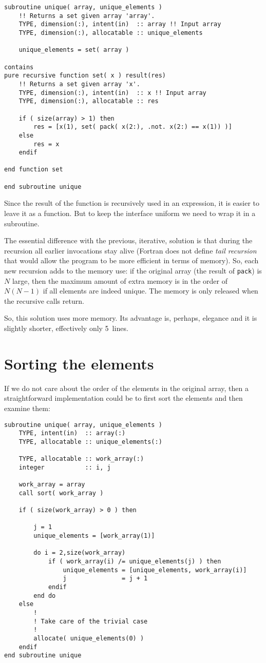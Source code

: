 \documentclass[onecolumn]{article}
\begin{document}
\begin{verbatim}
subroutine unique( array, unique_elements )
    !! Returns a set given array 'array'.
    TYPE, dimension(:), intent(in)  :: array !! Input array
    TYPE, dimension(:), allocatable :: unique_elements

    unique_elements = set( array )

contains
pure recursive function set( x ) result(res)
    !! Returns a set given array 'x'.
    TYPE, dimension(:), intent(in)  :: x !! Input array
    TYPE, dimension(:), allocatable :: res

    if ( size(array) > 1) then
        res = [x(1), set( pack( x(2:), .not. x(2:) == x(1)) )]
    else
        res = x
    endif

end function set

end subroutine unique
\end{verbatim}

Since the result of the function is recursively used in an expression, it is easier to leave it as a function. But to
keep the interface uniform we need to wrap it in a subroutine.

The essential difference with the previous, iterative, solution is that during the recursion all earlier invocations
stay alive (Fortran does not define \emph{tail recursion} that would allow the program to be more efficient in terms
of memory). So, each new recursion adds to the memory use: if the original array (the result of \verb+pack+) is $N$
large, then the maximum amount of extra memory is in the order of $N(N-1)$ if all elements are indeed unique. The
memory is only released when the recursive calls return.

So, this solution uses more memory. Its advantage is, perhaps, elegance and it is slightly shorter, effectively only 5~lines.


\section*{Sorting the elements}
If we do not care about the order of the elements in the original array, then a straightforward implementation
could be to first sort the elements and then examine them:

\begin{verbatim}
subroutine unique( array, unique_elements )
    TYPE, intent(in)  :: array(:)
    TYPE, allocatable :: unique_elements(:)

    TYPE, allocatable :: work_array(:)
    integer           :: i, j

    work_array = array
    call sort( work_array )

    if ( size(work_array) > 0 ) then

        j = 1
        unique_elements = [work_array(1)]

        do i = 2,size(work_array)
            if ( work_array(i) /= unique_elements(j) ) then
                unique_elements = [unique_elements, work_array(i)]
                j               = j + 1
            endif
        end do
    else
        !
        ! Take care of the trivial case
        !
        allocate( unique_elements(0) )
    endif
end subroutine unique
\end{verbatim}
\end{document}
